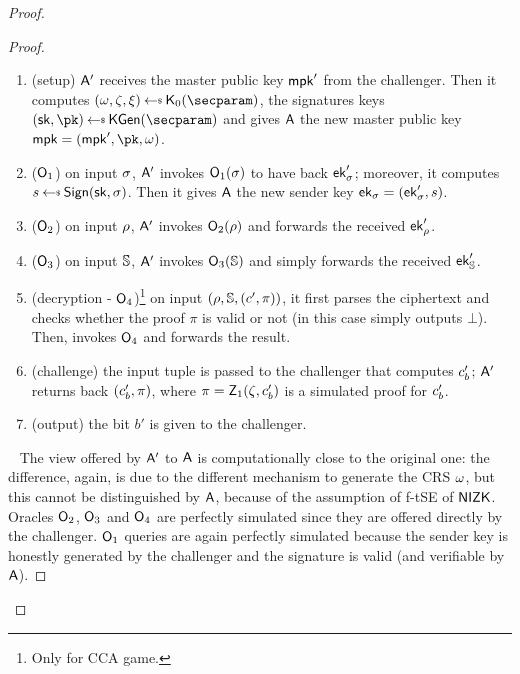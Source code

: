 \begin{proof}
\begin{lemma}
\begin{proof}
            \begin{enumerate}
                \item (setup) $\mathsf{A}'$ receives the master public key $\mathsf{mpk}'$ from the challenger. Then it computes $(\crs,\tpsim,\tpext)\getsr\nizkext_0(\secparam)$, the signatures keys $(\sk, \pk) \getsr \kgen(\secparam)$ and gives $\mathsf{A}$ the new master public key $\mpk = (\mpk', \pk, \crs)$.
                \item ($\mathsf{O}_1$) on input $\sigma$, $\mathsf{A}'$ invokes $\mathsf{O}_1(\sigma)$ to have back $\mathsf{ek}'_\sigma$; moreover, it computes $\signature \getsr \sign(\sk, \sattr)$. Then it gives $\mathsf{A}$ the new sender key $\mathsf{ek}_\sigma = (\mathsf{ek}'_\sigma, s)$.
                \item ($\mathsf{O}_2$) on input $\rho$, $\mathsf{A}'$ invokes $\mathsf{O}_2(\rho)$ and forwards the received $\mathsf{ek}'_\rho$.
                \item ($\mathsf{O}_3$) on input $\mathbb{S}$, $\mathsf{A}'$ invokes $\mathsf{O}_3(\mathbb{S})$ and simply forwards the received $\mathsf{ek}'_{\mathbb{S}}$.
                \item (decryption - $\mathsf{O}_4$)\footnote{Only for CCA game.} on input $(\rho, \mathbb{S}, (c', \pi))$, it first parses the ciphertext and checks whether the proof $\pi$ is valid or not (in this case simply outputs $\bot$). Then, invokes $\mathsf{O}_4$ and forwards the result.
                \item (challenge) the input tuple is passed to the challenger that computes $c'_b$; $\mathsf{A}'$ returns back $(c'_b, \pi)$, where $\pi = \mathsf{Z}_1(\zeta, c'_b)$ is a simulated proof for $c'_b$.
                \item (output) the bit $b'$ is given to the challenger.
            \end{enumerate}
            ~\newline
            The view offered by $\mathsf{A}'$ to $\mathsf{A}$ is computationally close to the original one: the difference, again, is due to the different mechanism to generate the CRS $\omega$, but this cannot be distinguished by $\mathsf{A}$, because of the assumption of f-tSE of $\mathsf{NIZK}$.
            Oracles $\mathsf{O}_2$, $\mathsf{O}_3$ and $\mathsf{O}_4$ are perfectly simulated since they are offered directly by the challenger.
            $\mathsf{O}_1$ queries are again perfectly simulated because the sender key is honestly generated by the challenger and the signature is valid (and verifiable by $\mathsf{A}$).
        \end{proof}
    \end{lemma}


\end{proof}
